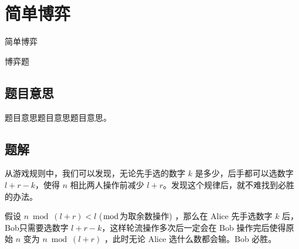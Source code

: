 \def\sectionName{简单博弈}
\section{\sectionName}



\begin{frame}

\isBeamerMode\relax
    {\Huge \sectionName}\par
\fi




博弈题



\end{frame}

\subsection{题目意思}
\begin{frame} %
题目意思题目意思题目意思。
\end{frame}



\subsection{题解}
\begin{frame} %

从游戏规则中，我们可以发现，无论先手选的数字 $k$ 是多少，后手都可以选数字 $l + r - k$，使得 $n$ 相比两人操作前减少 $l + r$。发现这个规律后，就不难找到必胜的办法。

假设 $n \bmod (l + r) < l$  ($\bmod$为取余数操作) ，那么在 Alice 先手选数字 $k$ 后，Bob只需要选数字 $l + r - k$，这样轮流操作多次后一定会在 Bob 操作完后使得原始 $n$ 变为 $n \bmod (l + r)$ ，此时无论 Alice 选什么数都会输。Bob 必胜。
\end{frame}

